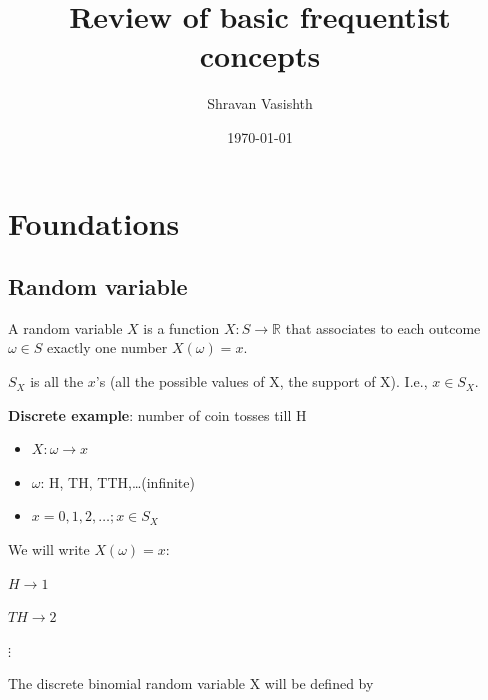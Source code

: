 \documentclass[12pt]{article}
\title{Review of basic frequentist concepts}
\author{Shravan Vasishth}
\date{\today}                                           %
\begin{document}
\maketitle

\section{Foundations}

\subsection{Random variable}

A random variable $X$ is a function $X : S \rightarrow \mathbb{R}$ that associates to each outcome
$\omega \in S$ exactly one number $X(\omega) = x$.

$S_X$ is all the $x$'s (all the possible values of X, the support of X). I.e., $x \in S_X$. 

\textbf{Discrete example}: number of coin tosses till H

\begin{itemize}
  \item $X: \omega \rightarrow x$
  \item $\omega$: H, TH, TTH,\dots (infinite)
  \item $x=0,1,2,\dots; x \in S_X$
\end{itemize}

We will write $X(\omega)=x$:

$H \rightarrow 1$\newline

$TH \rightarrow 2$\newline

$\vdots$





The discrete binomial random variable X will be defined by
\end{document}
